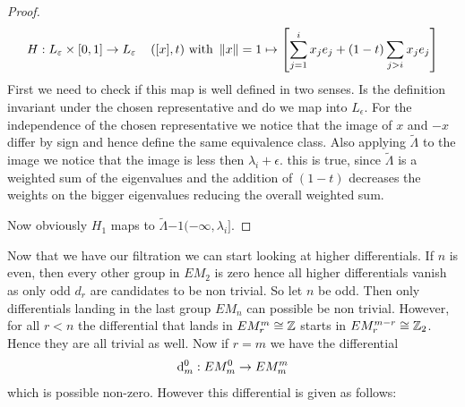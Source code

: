 \begin{example}
\begin{proof}
\begin{equation*}
	H:L_\varepsilon \times [0,1] \to L_\varepsilon\,\quad ([x],t) \text{ with }\left\lVert x\right\rVert=1 \mapsto \left[\sum_{j=1}^i x_je_j +(1-t)\sum_{j>i}x_je_j \right] 
\end{equation*} 
First we need to check if this map is well defined in two senses. Is the definition invariant under the chosen representative and do we map into $L_\epsilon$. 
For the independence of the chosen representative we notice that the image of $x$ and $-x$ differ by sign and hence define the same equivalence class. Also applying $\tilde{\Lambda}$ to the image we notice that the image is less then $\lambda_{i}+\epsilon$. this is true, since $\tilde{\Lambda}$ is a weighted sum of the eigenvalues and the addition of $(1-t)$ decreases the weights on the bigger eigenvalues reducing the overall weighted sum. 

Now obviously $H_1$ maps to  $\tilde{\Lambda}{-1}(-\infty,\lambda_i]$. 
	\end{proof}
	
	
	
	 Now that we have our filtration we can start looking at higher differentials. If $n$ is even, then every other group in $EM_2$ is zero hence all higher differentials vanish as only odd $d_r$ are candidates to be non trivial. So let $n$ be odd. Then only differentials landing in the last group $EM_n$ can possible be non trivial. However, for all $r<n$ the differential that lands in $EM_r^m \cong \mathbb{Z}$ starts in $EM_r^{m-r}\cong \mathbb{Z}_2$. Hence they are all trivial as well. Now if $r=m$ we have the differential 
	 \begin{equation*}
	 	\mathop{}\!\mathrm{d}_m^0:  EM_m^0 \to EM_m^m
	 \end{equation*} which is possible non-zero. However this differential is given as follows: 
	 

\end{example}
